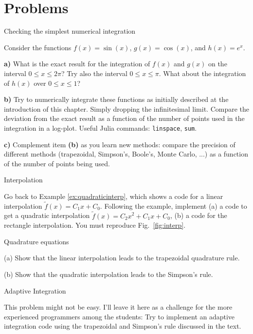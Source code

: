 \section{Problems}

\begin{problem}{Checking the simplest numerical integration}
 \label{prob:SimpleIntegral}

 Consider the functions $f(x) = \sin(x)$, $g(x) = \cos(x)$, and $h(x) = e^x$.
 
 \textbf{a)} What is the exact result for the integration of $f(x)$ and $g(x)$ on the interval $0 \leq x \leq 2\pi$? Try also the interval $0 \leq x \leq \pi$. What about the integration of $h(x)$ over $0 \leq x \leq 1$?
 
 \textbf{b)} Try to numerically integrate these functions as initially described at the introduction of this chapter. Simply dropping the infinitesimal limit. Compare the deviation from the exact result as a function of the number of points used in the integration in a log-plot. Useful Julia commands: \texttt{linspace}, \texttt{sum}.
 
 \textbf{c)} Complement item \textbf{(b)} as you learn new methods: compare the precision of different methods (trapezoidal, Simpson's, Boole's, Monte Carlo, ...) as a function of the number of points being used.
 
\end{problem}

\begin{problem}{Interpolation}
 \label{prob:interpolation}
 
 Go back to Example \ref{ex:quadraticinterp}, which shows a code for a linear interpolation $\tilde{f}(x) = C_1 x + C_0$. Following the example, implement (a) a code to get a quadratic interpolation $\tilde{f}(x) = C_2 x^2 + C_1 x + C_0$, (b) a code for the rectangle interpolation. You must reproduce Fig.~\ref{fig:interp}.
 
\end{problem}

\begin{problem}{Quadrature equations}
 \label{prob:quadrature}

 (a) Show that the linear interpolation leads to the trapezoidal quadrature rule.
 
 (b) Show that the quadratic interpolation leads to the Simpson's rule.
\end{problem}

\begin{problem}{Adaptive Integration}
 \label{prob:adaptive}
 
 This problem might not be easy. I'll leave it here as a challenge for the more experienced programmers among the students: Try to implement an adaptive integration code using the trapezoidal and Simpson's rule discussed in the text.
 
\end{problem}

